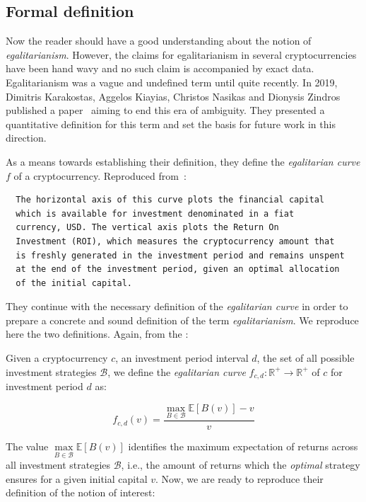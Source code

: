 \subsection{Formal definition}
Now the reader should have a good understanding about the notion of \emph{egalitarianism}. However, the claims for egalitarianism in several cryptocurrencies have been hand wavy and no such claim is accompanied by exact data. Egalitarianism was a vague and undefined term until quite recently. In 2019, Dimitris Karakostas, Aggelos Kiayias, Christos Nasikas and Dionysis Zindros published a paper~\cite{egalitarianism} aiming to end this era of ambiguity. They presented a quantitative definition for this term and set the basis for future work in this direction.

As a means towards establishing their definition, they define the \emph{egalitarian curve} $f$ of a cryptocurrency. Reproduced from~\cite{egalitarianism}:

\begin{verbatim}
  The horizontal axis of this curve plots the financial capital
  which is available for investment denominated in a fiat
  currency, USD. The vertical axis plots the Return On
  Investment (ROI), which measures the cryptocurrency amount that
  is freshly generated in the investment period and remains unspent
  at the end of the investment period, given an optimal allocation
  of the initial capital.
\end{verbatim}

They continue with the necessary definition of the \emph{egalitarian curve} in order to prepare a concrete and sound definition of the term \emph{egalitarianism}. We reproduce here the two definitions. Again, from the \cite{egalitarianism}:

\begin{definition}
    Given a cryptocurrency $c$, an investment period interval $d$, the set of
    all possible investment strategies $\mathcal{B}$, we define the \emph{egalitarian curve}
    $f_{c,d}: \mathbb{R}^+ \longrightarrow \mathbb{R}^+$ of $c$ for
    investment period $d$ as:

    \begin{equation}
      f_{c,d}(v) = \frac{\underset{B \in \mathcal{B}}{\max}{\mathbb{E}[B(v)]} - v}{v}
    \end{equation}
\end{definition}

The value $\underset{B \in \mathcal{B}}{\max}{\mathbb{E}[B(v)]}$ identifies the maximum expectation of
returns across all investment strategies $\mathcal{B}$, i.e., the amount of
returns which the \emph{optimal} strategy ensures for a given initial capital $v$. Now, we are ready to reproduce their definition of the notion of interest:

